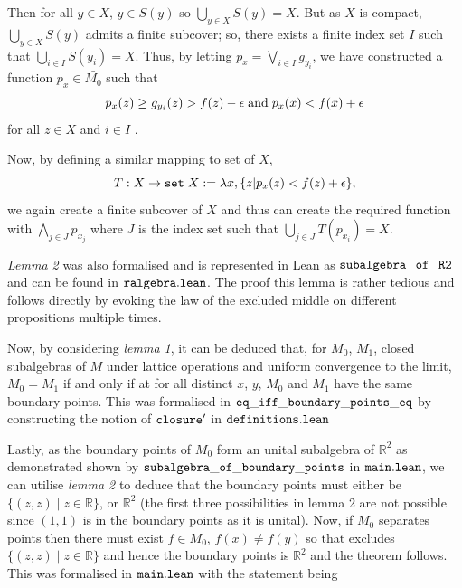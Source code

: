 \documentclass[landscape,final,a0paper]{baposter}
\begin{document}
\begin{poster}
{\begin{minipage}[t]{0.475\textwidth}
Then for all $y \in X$, $y \in S(y)$ so $\bigcup_{y\in X} S(y) = X$. But as $X$ is compact, $\bigcup_{y\in X} S(y)$ admits a finite subcover; 
so, there exists a finite index set $I$ such that $\bigcup_{i\in I} S(y_i) = X$. Thus, by letting $p_x = \bigvee_{i \in I} g_{y_i}$, we have constructed 
a function $p_x \in  \bar{M_0}$ such that 
$$
p_x(z) \ge g_{y_i}(z) > f(z) - \epsilon \hspace{1mm} \text{and} \hspace{1mm} p_x(x) < f(x) + \epsilon
$$
for all $z \in X$ and $i \in I$	.

Now, by defining a similar mapping to set of $X$, 
$$T : X \to \texttt{set} \hspace{1mm} X := \lambda x, \{z | p_x(z) < f(z) + \epsilon \},$$
we again create a finite subcover of $X$ and thus can create the required function with $\bigwedge_{j \in J}p_{x_j}$ where $J$ 
is the index set such that $\bigcup_{j\in J} T(p_{x_i}) = X$.
\end{minipage}
\begin{minipage}[t]{0.05\textwidth}
\hspace{0mm}
\end{minipage}
\begin{minipage}[t]{0.46\textwidth}

\textit{Lemma 2} was also formalised and is represented in Lean as $\tt{subalgebra\_of\_R2}$ and can be found in $\tt{ralgebra.lean}$.
The proof this lemma is rather tedious and follows directly by evoking the law of the excluded middle on different propositions 
multiple times.

\vspace{2mm}
Now, by considering \textit{lemma 1}, it can be deduced that, for $M_0$, $M_1$, closed subalgebras of $M$ under lattice 
operations and uniform convergence to the limit, $M_0 = M_1$ if and only if at for all distinct $x$, $y$, $M_0$ 
and $M_1$ have the same boundary points.
This was formalised in $\tt{eq\_iff\_boundary\_points\_eq}$ by constructing the notion of $\tt{closure'}$ in $\tt{definitions.lean}$

\vspace{2mm}
Lastly, as the boundary points of $M_0$ form an unital subalgebra of $\mathbb{R}^2$ 
as demonstrated shown by $\tt{subalgebra\_of\_boundary\_points}$ in $\tt{main.lean}$, we can utilise \textit{lemma 2} to 
deduce that the boundary points must either be $\{(z, z) \mid z \in \mathbb{R} \}$, or $\mathbb{R}^2$ (the first three possibilities in lemma 2 are not possible since $(1, 1)$ is in the boundary points as it is unital). Now, if $M_0$ separates points then there must exist $f \in M_0$, $f(x) \neq f(y)$ so that excludes $\{(z, z) \mid z \in \mathbb{R} \}$ and hence the boundary points is $\mathbb{R}^2$ and the theorem follows. This was formalised in $\tt{main.lean}$ with the statement being 


\end{minipage}}
\end{poster}
\end{document}
